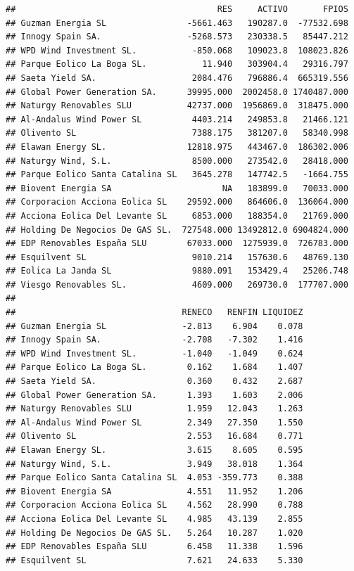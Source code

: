 \documentclass[
]{book}
\begin{document}
\begin{verbatim}
##                                        RES     ACTIVO       FPIOS
## Guzman Energia SL                -5661.463   190287.0  -77532.698
## Innogy Spain SA.                 -5268.573   230338.5   85447.212
## WPD Wind Investment SL.           -850.068   109023.8  108023.826
## Parque Eolico La Boga SL.           11.940   303904.4   29316.797
## Saeta Yield SA.                   2084.476   796886.4  665319.556
## Global Power Generation SA.      39995.000  2002458.0 1740487.000
## Naturgy Renovables SLU           42737.000  1956869.0  318475.000
## Al-Andalus Wind Power SL          4403.214   249853.8   21466.121
## Olivento SL                       7388.175   381207.0   58340.998
## Elawan Energy SL.                12818.975   443467.0  186302.006
## Naturgy Wind, S.L.                8500.000   273542.0   28418.000
## Parque Eolico Santa Catalina SL   3645.278   147742.5   -1664.755
## Biovent Energia SA                      NA   183899.0   70033.000
## Corporacion Acciona Eolica SL    29592.000   864606.0  136064.000
## Acciona Eolica Del Levante SL     6853.000   188354.0   21769.000
## Holding De Negocios De GAS SL.  727548.000 13492812.0 6904824.000
## EDP Renovables España SLU        67033.000  1275939.0  726783.000
## Esquilvent SL                     9010.214   157630.6   48769.130
## Eolica La Janda SL                9880.091   153429.4   25206.748
## Viesgo Renovables SL.             4609.000   269730.0  177707.000
## 
##                                 RENECO   RENFIN LIQUIDEZ
## Guzman Energia SL               -2.813    6.904    0.078
## Innogy Spain SA.                -2.708   -7.302    1.416
## WPD Wind Investment SL.         -1.040   -1.049    0.624
## Parque Eolico La Boga SL.        0.162    1.684    1.407
## Saeta Yield SA.                  0.360    0.432    2.687
## Global Power Generation SA.      1.393    1.603    2.006
## Naturgy Renovables SLU           1.959   12.043    1.263
## Al-Andalus Wind Power SL         2.349   27.350    1.550
## Olivento SL                      2.553   16.684    0.771
## Elawan Energy SL.                3.615    8.605    0.595
## Naturgy Wind, S.L.               3.949   38.018    1.364
## Parque Eolico Santa Catalina SL  4.053 -359.773    0.388
## Biovent Energia SA               4.551   11.952    1.206
## Corporacion Acciona Eolica SL    4.562   28.990    0.788
## Acciona Eolica Del Levante SL    4.985   43.139    2.855
## Holding De Negocios De GAS SL.   5.264   10.287    1.020
## EDP Renovables España SLU        6.458   11.338    1.596
## Esquilvent SL                    7.621   24.633    5.330

\end{verbatim}
\end{document}

